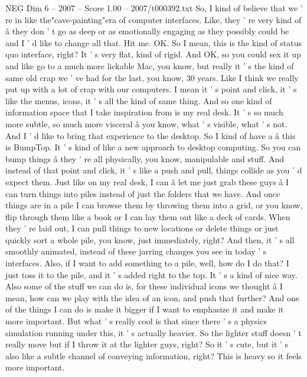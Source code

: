 \begin{textsample}{NEG Dim 6 – 2007 – Score 1.00 – 2007/t000392.txt}  \label{ex:f6_neg_062}
So, I kind of believe that we ' re in like the"cave-painting"era of computer interfaces.
Like, they ' re very kind of â they don ' t go as deep or as emotionally engaging as they possibly could be and I ' d like to change all that.
Hit me.
OK.
So I mean, this is the kind of status quo interface, right?
It ' s very flat, kind of rigid.
And OK, so you could sex it up and like go to a much more lickable Mac, you know, but really it ' s the kind of same old crap we ' ve had for the last, you know, 30 years.
Like I think we really put up with a lot of crap with our computers.
I mean it ' s point and click, it ' s like the menus, icons, it ' s all the kind of same thing.
And so one kind of information space that I take inspiration from is my real desk.
It ' s so much more subtle, so much more visceral â you know, what ' s visible, what ' s not.
And I ' d like to bring that experience to the desktop.
So I kind of have a â this is BumpTop.
It ' s kind of like a new approach to desktop computing.
So you can bump things â they ' re all physically, you know, manipulable and stuff.
And instead of that point and click, it ' s like a push and pull, things collide as you ' d expect them.
Just like on my real desk, I can â let me just grab these guys â I can turn things into piles instead of just the folders that we have.
And once things are in a pile I can browse them by throwing them into a grid, or you know, flip through them like a book or I can lay them out like a deck of cards.
When they ' re laid out, I can pull things to new locations or delete things or just quickly sort a whole pile, you know, just immediately, right?
And then, it ' s all smoothly animated, instead of these jarring changes you see in today ' s interfaces.
Also, if I want to add something to a pile, well, how do I do that?
I just toss it to the pile, and it ' s added right to the top.
It ' s a kind of nice way.
Also some of the stuff we can do is, for these individual icons we thought â I mean, how can we play with the idea of an icon, and push that further?
And one of the things I can do is make it bigger if I want to emphasize it and make it more important.
But what ' s really cool is that since there ' s a physics simulation running under this, it ' s actually heavier.
So the lighter stuff doesn ' t really move but if I throw it at the lighter guys, right?
So it ' s cute, but it ' s also like a subtle channel of conveying information, right?
This is heavy so it feels more important.

\end{textsample}
